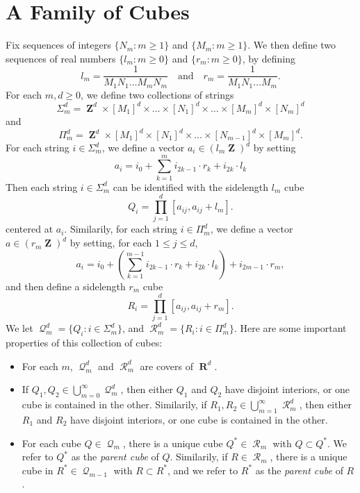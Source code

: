 \documentclass[12pt,reqno]{amsart}
\DeclareMathOperator{\RR}{\mathbf{R}}
\DeclareMathOperator{\ZZ}{\mathbf{Z}}
\DeclareMathOperator{\DQ}{\mathcal{Q}}
\DeclareMathOperator{\DR}{\mathcal{R}}
\begin{document}
\section{A Family of Cubes}

Fix sequences of integers $\{ N_m : m \geq 1 \}$ and $\{ M_m : m \geq 1 \}$. We then define two sequences of real numbers $\{ l_m : m \geq 0 \}$ and $\{ r_m : m \geq 0 \}$, by defining
%
\[ l_m = \frac{1}{M_1 N_1 \dots M_m N_m} \quad\text{and}\quad r_m = \frac{1}{M_1 N_1 \dots M_m}. \]
%
For each $m, d \geq 0$, we define two collections of strings
%
\[ \Sigma_m^d = \ZZ^d \times [M_1]^d \times \dots \times [N_1]^d \times \dots \times [M_m]^d \times [N_m]^d \]
%
and
%
\[ \Pi_m^d = \ZZ^d \times [M_1]^d \times [N_1]^d \times \dots \times [N_{m-1}]^d \times [M_m]^d. \]
%
For each string $i \in \Sigma_m^d$, we define a vector $a_i \in (l_m \ZZ)^d$ by setting
%
\[ a_i = i_0 + \sum_{k = 1}^m i_{2k-1} \cdot r_k + i_{2k} \cdot l_k \]
%
Then each string $i \in \Sigma_m^d$ can be identified with the sidelength $l_m$ cube
%
\[ Q_i = \prod_{j = 1}^d \left[ a_{ij}, a_{ij} + l_m \right]. \]
%
centered at $a_i$. Similarily, for each string $i \in \Pi_m^d$, we define a vector $a \in (r_m \ZZ)^d$ by setting, for each $1 \leq j \leq d$,
%
\[ a_i = i_0 + \left( \sum_{k = 1}^{m-1} i_{2k-1} \cdot r_k + i_{2k} \cdot l_k \right) + i_{2m-1} \cdot r_m, \]
%
and then define a sidelength $r_m$ cube
%
\[ R_i = \prod_{j = 1}^d \left[ a_{ij}, a_{ij} + r_m \right]. \]
%
We let $\DQ_m^d = \{ Q_i : i \in \Sigma_m^d \}$, and $\DR_m^d = \{ R_i : i \in \Pi_m^d \}$. Here are some important properties of this collection of cubes:
%
\begin{itemize}
	\item For each $m$, $\DQ_m^d$ and $\DR_m^d$ are covers of $\RR^d$.

	\item If $Q_1,Q_2 \in \bigcup_{m = 0}^\infty \DQ_m^d$, then either $Q_1$ and $Q_2$ have disjoint interiors, or one cube is contained in the other. Similarily, if $R_1,R_2 \in \bigcup_{m = 1}^\infty \DR_m^d$, then either $R_1$ and $R_2$ have disjoint interiors, or one cube is contained in the other.

	\item For each cube $Q \in \DQ_m$, there is a unique cube $Q^* \in \DR_m$ with $Q \subset Q^*$. We refer to $Q^*$ as the \emph{parent cube} of $Q$. Similarily, if $R \in \DR_m$, there is a unique cube in $R^* \in \DQ_{m-1}$ with $R \subset R^*$, and we refer to $R^*$ as the \emph{parent cube} of $R$.
\end{itemize}
\end{document}
